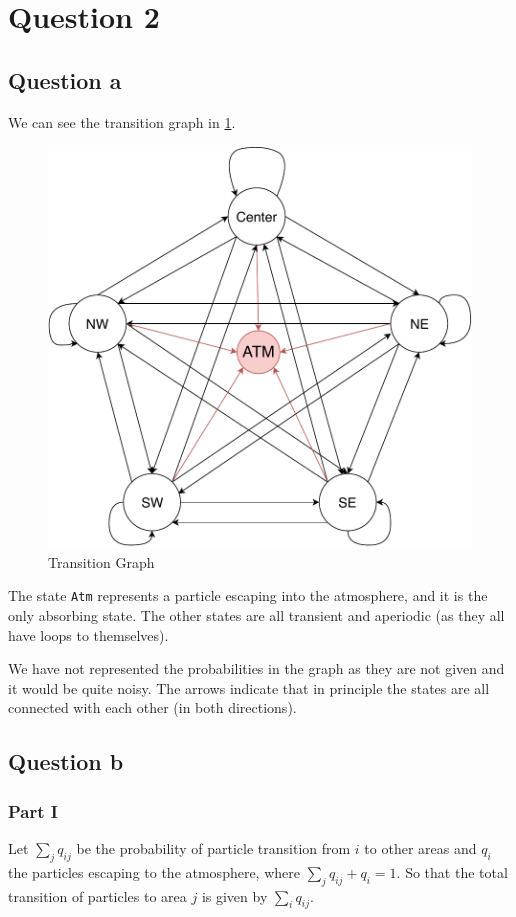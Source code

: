 \documentclass[11pt, a4paper]{article}
\begin{document}
\section{Question 2}
\subsection{Question a}
We can see the transition graph in \cref{fig:trans-graph}.
\begin{figure}[H]
	\centering
	\includegraphics[scale = .7]{figures/transition-graph.pdf}
	\caption{Transition Graph}
	\label{fig:trans-graph}
\end{figure}
The state \verb|Atm| represents a particle escaping into the atmosphere, and it is the only absorbing state. The other states are all transient and aperiodic (as they all have loops to themselves).

We have not represented the probabilities in the graph as they are not given and it would be quite noisy. The arrows indicate that in principle the states are all connected with each other (in both directions).

\subsection{Question b}
\subsubsection*{Part I}
Let  $\sum_j q_{ij} $ be the probability of particle transition from $i$ to other areas and $q_i$ the particles escaping to the atmosphere, where $\sum_j q_{ij} + q_i = 1$.  So that the total transition of particles to area $j$ is given by $\sum_i q_{ij}$. 
\end{document}
